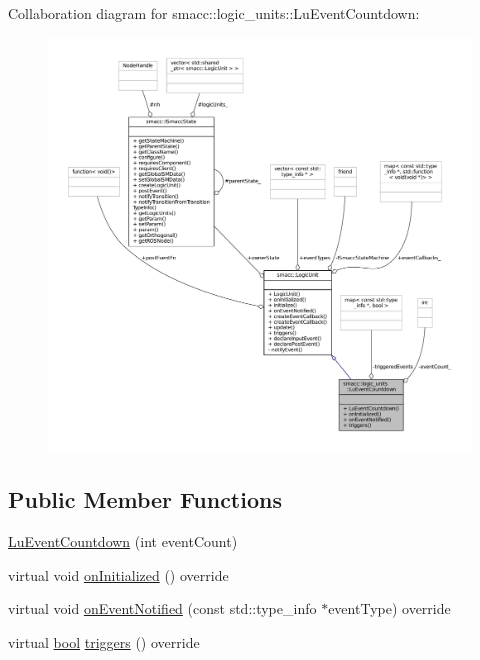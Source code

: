 Collaboration diagram for smacc\+:\+:logic\+\_\+units\+:\+:Lu\+Event\+Countdown\+:
\nopagebreak
\begin{figure}[H]
\begin{center}
\leavevmode
\includegraphics[width=350pt]{classsmacc_1_1logic__units_1_1LuEventCountdown__coll__graph}
\end{center}
\end{figure}
\subsection*{Public Member Functions}
\begin{DoxyCompactItemize}
\item 
\hyperlink{classsmacc_1_1logic__units_1_1LuEventCountdown_a50f81b10581e565ba43f1338b4f400b8}{Lu\+Event\+Countdown} (int event\+Count)
\item 
virtual void \hyperlink{classsmacc_1_1logic__units_1_1LuEventCountdown_a8e58411b2e6c2a68fa0218ea7c125a75}{on\+Initialized} () override
\item 
virtual void \hyperlink{classsmacc_1_1logic__units_1_1LuEventCountdown_a9a7b8d4690d21251ad3e12b2bca00620}{on\+Event\+Notified} (const std\+::type\+\_\+info $\ast$event\+Type) override
\item 
virtual \hyperlink{classbool}{bool} \hyperlink{classsmacc_1_1logic__units_1_1LuEventCountdown_a77e004c01a966113e63ded6be7c8ab5d}{triggers} () override
\end{DoxyCompactItemize}
